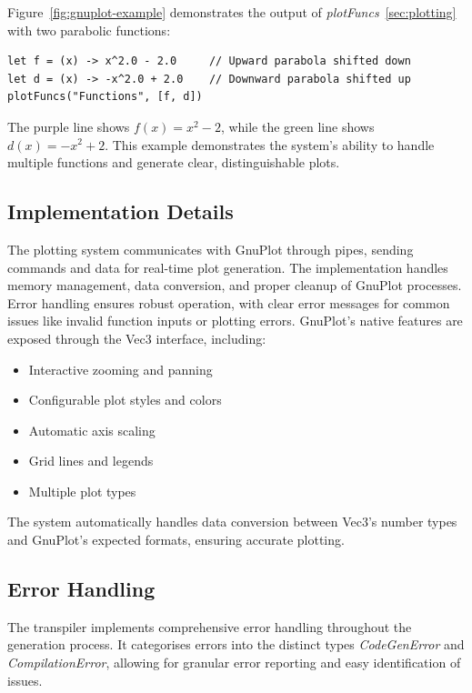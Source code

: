 Figure~\ref{fig:gnuplot-example} demonstrates the output of \textit{plotFuncs}~\ref{sec:plotting} with two parabolic functions:

\begin{verbatim}
let f = (x) -> x^2.0 - 2.0     // Upward parabola shifted down
let d = (x) -> -x^2.0 + 2.0    // Downward parabola shifted up
plotFuncs("Functions", [f, d])
\end{verbatim}

The purple line shows $f(x) = x^2 - 2$, while the green line shows $d(x) = -x^2 + 2$.
This example demonstrates the system's ability to handle multiple functions and generate clear, distinguishable plots.

\subsection{Implementation Details}\label{subsec:plotting-implementation}

The plotting system communicates with GnuPlot through pipes, sending commands and data for real-time plot generation.
The implementation handles memory management, data conversion, and proper cleanup of GnuPlot processes.
Error handling ensures robust operation, with clear error messages for common issues like invalid function inputs or plotting errors.
GnuPlot's native features are exposed through the Vec3 interface, including:

\begin{itemize}
    \item Interactive zooming and panning
    \item Configurable plot styles and colors
    \item Automatic axis scaling
    \item Grid lines and legends
    \item Multiple plot types
\end{itemize}

The system automatically handles data conversion between Vec3's number types and GnuPlot's expected formats, 
ensuring accurate plotting.

\subsection{Error Handling}\label{subsec:error-handling}

The transpiler implements comprehensive error handling throughout the generation process. 
It categorises errors into the distinct types \textit{CodeGenError} and \textit{CompilationError}, allowing for
granular error reporting and easy identification of issues.

